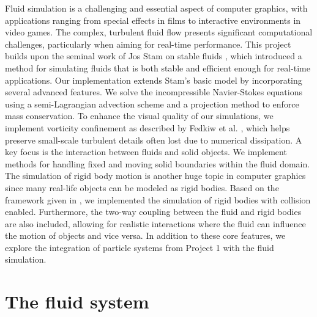 


\maketitle

Fluid simulation is a challenging and essential aspect of computer graphics, with applications ranging from special effects in films to interactive environments in video games. The complex, turbulent fluid flow presents significant computational challenges, particularly when aiming for real-time performance. This project builds upon the seminal work of Jos Stam on stable fluids \cite{stam1999stable, stam2003realtime}, which introduced a method for simulating fluids that is both stable and efficient enough for real-time applications.
Our implementation extends Stam's basic model by incorporating several advanced features. We solve the incompressible Navier-Stokes equations using a semi-Lagrangian advection scheme and a projection method to enforce mass conservation. To enhance the visual quality of our simulations, we implement vorticity confinement as described by Fedkiw et al. \cite{fedkiw2001visual}, which helps preserve small-scale turbulent details often lost due to numerical dissipation.
A key focus is the interaction between fluids and solid objects. We implement methods for handling fixed and moving solid boundaries within the fluid domain.\\ 
The simulation of rigid body motion is another huge topic in computer graphics since many real-life objects can be modeled as rigid bodies. Based on the framework given in \cite{coursenote}, we implemented the simulation of rigid bodies with collision enabled. Furthermore, the two-way coupling between the fluid and rigid bodies are also included, allowing for realistic interactions where the fluid can influence the motion of objects and vice versa. In addition to these core features, we explore the integration of particle systems from Project 1 with the fluid simulation.

\section{The fluid system}
